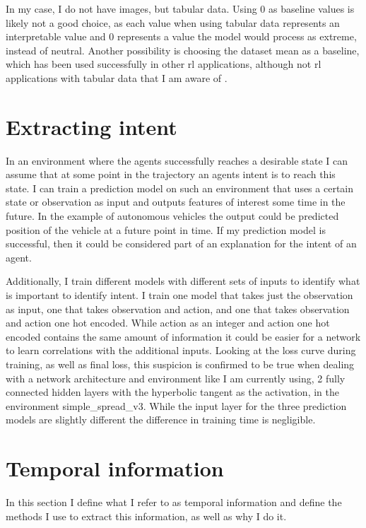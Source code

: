 \documentclass[UKenglish]{uiomasterthesis}
\begin{document}
In my case, I do not have images, but tabular data. Using $0$ as baseline values is likely not a good choice, as each value when using tabular data represents an interpretable value and $0$ represents a value the model would process as extreme, instead of neutral. Another possibility is choosing the dataset mean as a baseline, which has been used successfully in other \ac{rl} applications, although not \ac{rl} applications with tabular data that I am aware of \cite{baseline_rl}.


\section{Extracting intent}
\label{sec:intent_meth}
In an environment where the agents successfully reaches a desirable state I can assume that at some point in the trajectory an agents intent is to reach this state. I can train a prediction model on such an environment that uses a certain state or observation as input and outputs features of interest some time in the future. In the example of autonomous vehicles the output could be predicted position of the vehicle at a future point in time. If my prediction model is successful, then it could be considered part of an explanation for the intent of an agent.

Additionally, I train different models with different sets of inputs to identify what is important to identify intent. I train one model that takes just the observation as input, one that takes observation and action, and one that takes observation and action one hot encoded. While action as an integer and action one hot encoded contains the same amount of information it could be easier for a network to learn correlations with the additional inputs. Looking at the loss curve during training, as well as final loss, this suspicion is confirmed to be true when dealing with a network architecture and environment like I am currently using, 2 fully connected hidden layers with the hyperbolic tangent as the activation, in the environment simple\_spread\_v3. While the input layer for the three prediction models are slightly different the difference in training time is negligible. 


\section{Temporal information}
\label{sec:temp_meth}
In this section I define what I refer to as temporal information and define the methods I use to extract this information, as well as why I do it.
\end{document}

